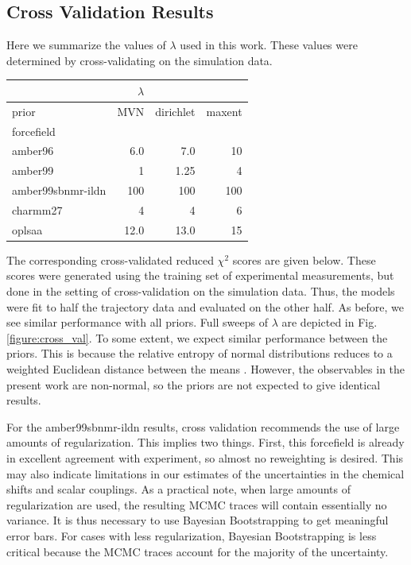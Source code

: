 \documentclass[12pt]{article}
\begin{document}
\subsection*{Cross Validation Results}

Here we summarize the values of $\lambda$ used in this work.  These values were determined by cross-validating on the simulation data.  

\vspace{5mm}

\begin{tabular}{lrrr}
\toprule
{}                &$\lambda$  &   &      \\
\midrule
prior &       MVN &  dirichlet & maxent \\
forcefield        &           &         \\
amber96           &      6.0  &    7.0  & 10 \\
amber99           &      1    &    1.25 & 4 \\
amber99sbnmr-ildn &      100  &    100  & 100 \\
charmm27          &      4    &   4     & 6 \\
oplsaa            &     12.0 &    13.0  & 15 \\
\bottomrule
\end{tabular}

\vspace{5mm}

The corresponding cross-validated reduced $\chi^2$ scores are given below.  These scores were generated using the training set of experimental measurements, but done in the setting of cross-validation on the simulation data.  Thus, the models were fit to half the trajectory data and evaluated on the other half.  As before, we see similar performance with all priors.  Full sweeps of $\lambda$ are depicted in Fig. \ref{figure:cross_val}.  To some extent, we expect similar performance between the priors.  This is because the relative entropy of normal distributions reduces to a weighted Euclidean distance between the means \cite{relative_entropy_wiki}.  However, the observables in the present work are non-normal, so the priors are not expected to give identical results.

For the amber99sbnmr-ildn results, cross validation recommends the use of large amounts of regularization.  This implies two things.  First, this forcefield is already in excellent agreement with experiment, so almost no reweighting is desired.  This may also indicate limitations in our estimates of the uncertainties in the chemical shifts and scalar couplings.  As a practical note, when large amounts of regularization are used, the resulting MCMC traces will contain essentially no variance.  It is thus necessary to use Bayesian Bootstrapping to get meaningful error bars.  For cases with less regularization, Bayesian Bootstrapping is less critical because the MCMC traces account for the majority of the uncertainty.
\end{document}
